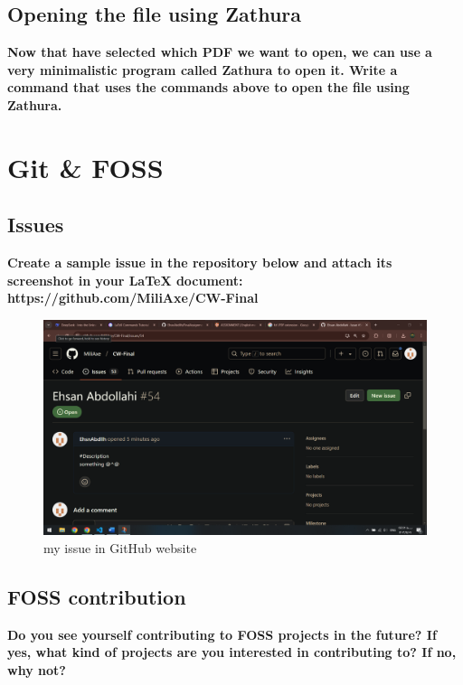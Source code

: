 \documentclass{article}
\begin{document}
\subsection{Opening the file using Zathura}
\textbf{Now that have selected which PDF we want to open, we can use a very minimalistic program called Zathura to open it. Write a command that uses the commands above to open the file using Zathura.}

\section{Git \& FOSS}
\subsection{Issues}
\textbf{Create a sample issue in the repository below and attach its screenshot in your LaTeX document: https://github.com/MiliAxe/CW-Final}
\begin{figure}[h]
    \centering
    \includegraphics[width=1\textwidth]{Screenshot.png}
    \caption{my issue in GitHub website}
    \label{fig:my_image}
\end{figure}
\subsection{FOSS contribution}
\textbf{Do you see yourself contributing to FOSS projects in the future? If yes, what kind of projects are you interested in contributing to? If no, why not?}
\end{document}
